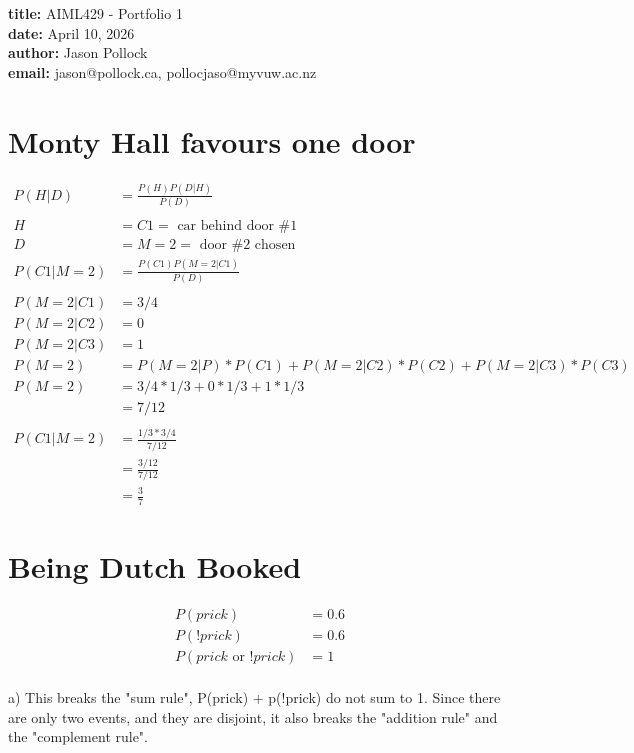 \documentclass[11pt]{article}
\begin{document}
\noindent
\textbf{title:} AIML429 - Portfolio 1 \\
\textbf{date:} April 10, 2026 \\
\textbf{author:} Jason Pollock \\
\textbf{email:} jason@pollock.ca, pollocjaso@myvuw.ac.nz \\
	
\section{Monty Hall favours one door}
	

\begin{align*}
	P(H|D) &= \frac{P(H)P(D|H)}{P(D)} \\
	\\
    H &= C1 = \text{ car behind door \#1} \\
    D &= M{=}2 = \text{ door \#2 chosen} \\
    P(C1|M{=}2) &= \frac{P(C1)P(M{=}2|C1)}{P(D)} \\
    \\
    P(M{=}2|C1) &= 3/4\\
    P(M{=}2|C2) &= 0\\
    P(M{=}2|C3) &= 1\\
    P(M{=}2) &= P(M{=}2|P)*P(C1) + P(M{=}2|C2)*P(C2) + P(M{=}2|C3)*P(C3) \\
    P(M{=}2) &= 3/4*1/3 + 0*1/3 + 1 * 1/3  \\
    	&= 7/12 \\
    \\
    P(C1|M{=}2) &= \frac{1/3 * 3/4}{7/12} \\
    &= \frac{3/12}{7/12} \\
    &= \frac{3}{7}
\end{align*}	

\section{Being Dutch Booked}

\begin{align*}
P(prick) &= 0.6 \\
P(!prick) &= 0.6 \\
P(prick \text{ or } !prick) &= 1\\
\end{align*}

a) This breaks the "sum rule", P(prick) + p(!prick) do not sum to 1. Since there are only two events, and they are disjoint, it also breaks the "addition rule" and the "complement rule".
\end{document}
